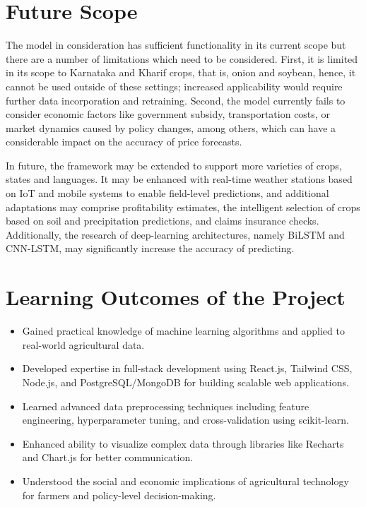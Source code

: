 \section{Future Scope}
The model in consideration has sufficient functionality in its current scope but there are a number of limitations which need to be considered. First, it is limited in its scope to Karnataka and Kharif crops, that is, onion and soybean, hence, it cannot be used outside of these settings; increased applicability would require further data incorporation and retraining. Second, the model currently fails to consider economic factors like government subsidy, transportation costs, or market dynamics caused by policy changes, among others, which can have a considerable impact on the accuracy of price forecasts.

In future, the framework may be extended to support more varieties of crops, states and languages. It may be enhanced with real-time weather stations based on IoT and mobile systems to enable field-level predictions, and additional adaptations may comprise profitability estimates, the intelligent selection of crops based on soil and precipitation predictions, and claims insurance checks. Additionally, the research of deep-learning architectures, namely BiLSTM and CNN-LSTM, may significantly increase the accuracy of predicting.

\section{Learning Outcomes of the Project}
\begin{itemize}
    \item Gained practical knowledge of machine learning algorithms and applied to real-world agricultural data.
    \item Developed expertise in full-stack development using React.js, Tailwind CSS, Node.js, and PostgreSQL/MongoDB for building scalable web applications.
    \item Learned advanced data preprocessing techniques including feature engineering, hyperparameter tuning, and cross-validation using scikit-learn.
    \item Enhanced ability to visualize complex data through libraries like Recharts and Chart.js for better communication.
    \item Understood the social and economic implications of agricultural technology for farmers and policy-level decision-making.
\end{itemize}
